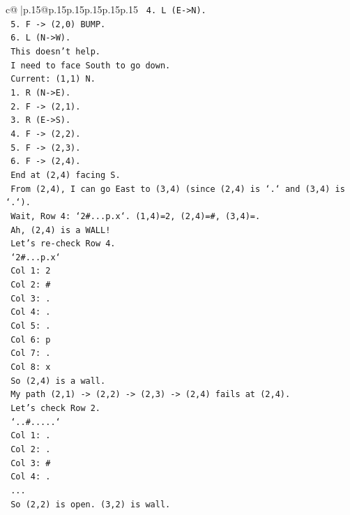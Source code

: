 \documentclass{article}
\begin{document}
{\begin{supertabular}{c@{$\;$}|p{.15\linewidth}@{}p{.15\linewidth}p{.15\linewidth}p{.15\linewidth}p{.15\linewidth}p{.15\linewidth}}
{{{\texttt{   4. L (E{-}>N).} \\
\texttt{   5. F {-}> (2,0) BUMP.} \\
\texttt{   6. L (N{-}>W).} \\
\texttt{   This doesn't help.} \\
\texttt{   I need to face South to go down.} \\
\texttt{   Current: (1,1) N.} \\
\texttt{   1. R (N{-}>E).} \\
\texttt{   2. F {-}> (2,1).} \\
\texttt{   3. R (E{-}>S).} \\
\texttt{   4. F {-}> (2,2).} \\
\texttt{   5. F {-}> (2,3).} \\
\texttt{   6. F {-}> (2,4).} \\
\texttt{   End at (2,4) facing S.} \\
\texttt{   From (2,4), I can go East to (3,4) (since (2,4) is `.` and (3,4) is `.`).} \\
\texttt{   Wait, Row 4: `2\#...p.x`. (1,4)=2, (2,4)=\#, (3,4)=.} \\
\texttt{   Ah, (2,4) is a WALL!} \\
\texttt{   Let's re{-}check Row 4.} \\
\texttt{   `2\#...p.x`} \\
\texttt{   Col 1: 2} \\
\texttt{   Col 2: \#} \\
\texttt{   Col 3: .} \\
\texttt{   Col 4: .} \\
\texttt{   Col 5: .} \\
\texttt{   Col 6: p} \\
\texttt{   Col 7: .} \\
\texttt{   Col 8: x} \\
\texttt{   So (2,4) is a wall.} \\
\texttt{   My path (2,1) {-}> (2,2) {-}> (2,3) {-}> (2,4) fails at (2,4).} \\
\texttt{   Let's check Row 2.} \\
\texttt{   `..\#.....`} \\
\texttt{   Col 1: .} \\
\texttt{   Col 2: .} \\
\texttt{   Col 3: \#} \\
\texttt{   Col 4: .} \\
\texttt{   ...} \\
\texttt{   So (2,2) is open. (3,2) is wall.} \\
}}}
\end{supertabular}}
\end{document}
